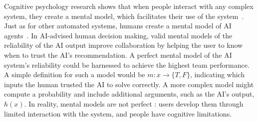 \documentclass[letterpaper]{article} %
\newcommand{\bug}
    {\mbox{\rule{2mm}{2mm}}}
\newcommand{\Bug}[1]
    {\bug \footnote{BUG: {#1}}}
\newcommand{\?}{\mbox{?}}
\newcommand{\name}{AI-advised human decision making}
\begin{document}
\noindent Cognitive psychology research shows that when people interact with any complex system, they create a mental model, which facilitates their use of the system~\cite{donald1988psychology}. Just as for other automated systems, humans create a mental model of AI agents~\cite{kulesza2012tell}.
In \name, valid mental models of the reliability of the AI output improve collaboration by helping the user to know when to trust the AI's recommendation.
A perfect mental model of the AI system's reliability could be harnessed to achieve the highest team performance. A simple definition for such a model would be $m: x \rightarrow \{T, F\}$, indicating which inputs the human trusted the AI to solve correctly. A more complex model might compute a probability and include additional arguments, such as  the AI's output, $h(x).$
In reality, mental models are not perfect \cite{norman2014some}: users develop them through limited interaction with the system, and people have cognitive limitations.
\end{document}
